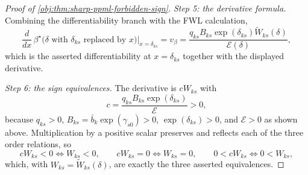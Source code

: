 \begin{proof}[Proof of \cref{obj:thm:sharp-ppml-forbidden-sign}]
\textit{Step 5: the derivative formula.} Combining the differentiability branch with the FWL calculation,
\[
\frac{d}{dx}\,\beta^\star\!\bigl(\delta\text{ with }\delta_{ks}\text{ replaced by }x\bigr)\Big|_{x=\delta_{ks}}
=
v_\beta
=
\frac{q_{ks}B_{ks}\exp(\delta_{ks})\widetilde W_{ks}(\delta)}{\mathcal E(\delta)} ,
\]
which is the asserted differentiability at \(x=\delta_{ks}\) together with the displayed derivative.

\textit{Step 6: the sign equivalences.} The derivative is \(cW_{ks}\) with
\[
c=\frac{q_{ks}B_{ks}\exp(\delta_{ks})}{\mathcal E}>0,
\]
because \(q_{ks}>0\), \(B_{ks}=\bar b_k\exp(\gamma_{s0})>0\), \(\exp(\delta_{ks})>0\), and \(\mathcal E>0\) as shown above. Multiplication by a positive scalar preserves and reflects each of the three order relations, so
\[
cW_{ks}<0\iff W_{ks}<0,
\qquad
cW_{ks}=0\iff W_{ks}=0,
\qquad
0<cW_{ks}\iff 0<W_{ks},
\]
which, with \(W_{ks}=\widetilde W_{ks}(\delta)\), are exactly the three asserted equivalences.
\end{proof}

